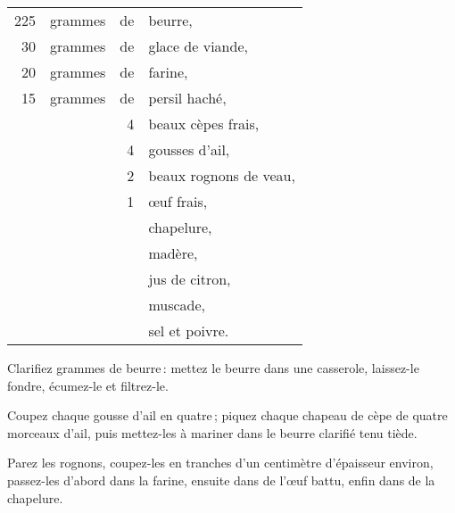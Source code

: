 \footnotesize
\begin{longtable}{rrrp{18em}}
    225 & grammes & de & beurre,                                                                          \\
     30 & grammes & de & glace de viande,                                                                 \\
     20 & grammes & de & farine,                                                                          \\
     15 & grammes & de & persil haché,                                                                    \\
        &         &  4 & beaux cèpes frais,                                                               \\
        &         &  4 & gousses d'ail,                                                                   \\
        &         &  2 & beaux rognons de veau,                                                           \\
        &         &  1 & œuf frais,                                                                       \\
        &         &    & chapelure,                                                                       \\
        &         &    & madère,                                                                          \\
        &         &    & jus de citron,                                                                   \\
        &         &    & muscade,                                                                         \\
        &         &    & sel et poivre.                                                                   \\
\end{longtable}
\normalsize

Clarifiez {\mmm} grammes de beurre : mettez le beurre dans une casserole,
laissez-le fondre, écumez-le et filtrez-le.

Coupez chaque gousse d'ail en quatre ; piquez chaque chapeau de cèpe de quatre
morceaux d'ail, puis mettez-les à mariner dans le beurre clarifié tenu tiède.

Parez les rognons, coupez-les en tranches d'un centimètre d'épaisseur environ,
passez-les d'abord dans la farine, ensuite dans de l'œuf battu, enfin dans de
la chapelure.

